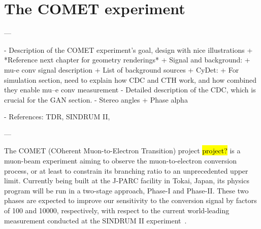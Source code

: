 \chapter{The COMET experiment}\label{chapter2}

\begin{markdown}
---

- Description of the COMET experiment's goal, design with nice illustrations
    + *Reference next chapter for geometry renderings*
    + Signal and background:
        + mu-e conv signal description
        + List of background sources
+ CyDet:
    + For simulation section, need to explain how CDC and CTH work, and how combined they enable mu--e conv measurement
    - Detailed description of the CDC, which is crucial for the GAN section.
     - Stereo angles
+ Phase alpha

- References: TDR, SINDRUM II, 

---
\end{markdown}

The COMET (COherent Muon-to-Electron Transition) project \hl{project?} is a
muon-beam experiment aiming to observe the muon-to-electron conversion process,
or at least to constrain its branching ratio to an unprecedented upper limit.
Currently being built at the J-PARC facility in Tokai, Japan, its physics
program will be run in a two-stage approach, Phase-I and Phase-II. These two
phases are expected to improve our sensitivity to the conversion signal by
factors of 100 and \num{10000}, respectively, with respect to the current
world-leading measurement conducted at the SINDRUM II
experiment~\cite{Bertl:2006up}.



